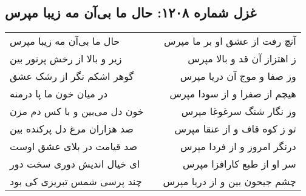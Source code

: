 \begin{center}
\section*{غزل شماره ۱۲۰۸: حال ما بی‌آن مه زیبا مپرس}
\label{sec:1208}
\begin{longtable}{l p{0.5cm} r}
حال ما بی‌آن مه زیبا مپرس
&&
آنچ رفت از عشق او بر ما مپرس
\\
زیر و بالا از رخش پرنور بین
&&
ز اهتزاز آن قد و بالا مپرس
\\
گوهر اشکم نگر از رشک عشق
&&
وز صفا و موج آن دریا مپرس
\\
در میان خون ما پا درمنه
&&
هیچم از صفرا و از سودا مپرس
\\
خون دل می‌بین و با کس دم مزن
&&
وز نگار شنگ سرغوغا مپرس
\\
صد هزاران مرغ دل پرکنده بین
&&
تو ز کوه قاف و از عنقا مپرس
\\
صد قیامت در بلای عشق اوست
&&
درنگر امروز و از فردا مپرس
\\
ای خیال اندیش دوری سخت دور
&&
سر او از طبع کارافزا مپرس
\\
چند پرسی شمس تبریزی کی بود
&&
چشم جیحون بین و از دریا مپرس
\\
\end{longtable}
\end{center}

